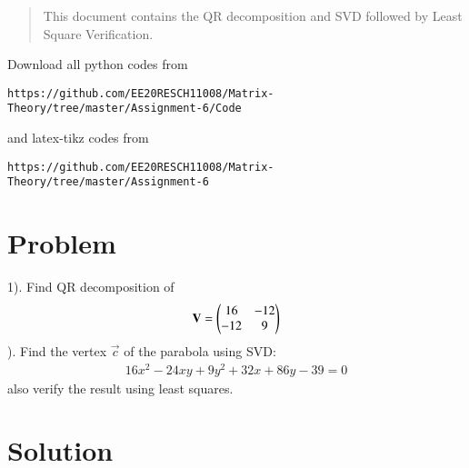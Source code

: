 \documentclass[journal,12pt,twocolumn]{IEEEtran}
\begin{document}
%
\begin{abstract}
This document contains the QR decomposition and SVD followed by Least Square Verification.
\end{abstract}
Download all python codes from 
%
\begin{lstlisting}
https://github.com/EE20RESCH11008/Matrix-Theory/tree/master/Assignment-6/Code
\end{lstlisting}
%
and latex-tikz codes from 
%
\begin{lstlisting}
https://github.com/EE20RESCH11008/Matrix-Theory/tree/master/Assignment-6
\end{lstlisting}
\section{Problem}
1). Find QR decomposition of 
\begin{align}
   \mathbf{V}=\begin{pmatrix}16 & -12 \\ -12 & 9 \end{pmatrix} 
\end{align}
). Find the vertex $\vec{c}$ of the parabola using SVD:
\begin{align}
   16x^2-24xy+9y^2+32x+86y-39=0 \label{eq:conic}
\end{align} \quad also verify the result using least squares.
\section{Solution}
\end{document}
